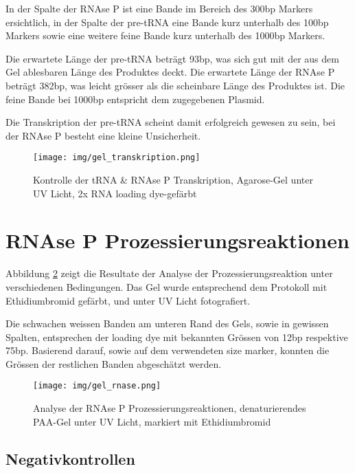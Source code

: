 \documentclass[a4paper,english]{scrreprt}
\begin{document}
In der Spalte der RNAse P ist eine Bande im Bereich des 300bp Markers
ersichtlich, in der Spalte der pre-tRNA eine Bande kurz unterhalb des 100bp
Markers sowie eine weitere feine Bande kurz unterhalb des 1000bp Markers.

Die erwartete Länge der pre-tRNA beträgt 93bp, was sich gut mit der aus dem Gel
ablesbaren Länge des Produktes deckt. Die erwartete Länge der RNAse P beträgt
382bp, was leicht grösser als die scheinbare Länge des Produktes ist. Die feine
Bande bei 1000bp entspricht dem zugegebenen Plasmid.

Die Transkription der pre-tRNA scheint damit erfolgreich gewesen zu sein, bei
der RNAse P besteht eine kleine Unsicherheit.

\begin{figure}[h]
	\centering
	\texttt{[image: img/gel\_transkription.png]}
	\caption{Kontrolle der tRNA \& RNAse P Transkription, Agarose-Gel unter UV Licht, 2x RNA loading dye-gefärbt}
	\label{fig:transkription_kontrolle}
\end{figure}

\section{RNAse P Prozessierungsreaktionen}

Abbildung \ref{fig:rnase_prozessierungsreaktionen} zeigt die Resultate der
Analyse der Prozessierungsreaktion unter verschiedenen Bedingungen. Das Gel
wurde entsprechend dem Protokoll mit Ethidiumbromid gefärbt, und unter UV
Licht fotografiert.

Die schwachen weissen Banden am unteren Rand des Gels, sowie in gewissen
Spalten, entsprechen der loading dye mit bekannten Grössen von 12bp respektive
75bp. Basierend darauf, sowie auf dem verwendeten size marker, konnten die
Grössen der restlichen Banden abgeschätzt werden.

\begin{figure}[h]
	\centering
	\texttt{[image: img/gel\_rnase.png]}
	\caption{Analyse der RNAse P Prozessierungsreaktionen, denaturierendes PAA-Gel unter UV Licht, markiert mit Ethidiumbromid}
	\label{fig:rnase_prozessierungsreaktionen}
\end{figure}


\subsection{Negativkontrollen}
\end{document}
